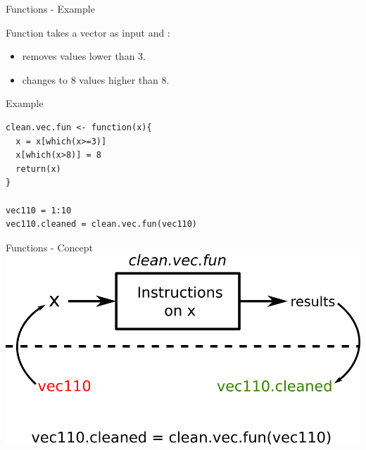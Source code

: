 \documentclass[10pt]{beamer}
\begin{document}
\begin{frame}[fragile]{Functions - Example}
  \begin{block}{}
    Function takes a {\sf vector} as input and :
    \begin{itemize}
    \item removes values lower than 3.
    \item changes to 8 values higher than 8.
    \end{itemize}    
  \end{block}
  
  \begin{exampleblock}{Example}
\begin{verbatim}
clean.vec.fun <- function(x){
  x = x[which(x>=3)]
  x[which(x>8)] = 8
  return(x)
}  

vec110 = 1:10
vec110.cleaned = clean.vec.fun(vec110)
\end{verbatim}
  \end{exampleblock}
  
\end{frame}

\begin{frame}{Functions - Concept}
  \centering
  \includegraphics[width=\textwidth]{../imgs/function-cartoon.png}
\end{frame}
\end{document}
